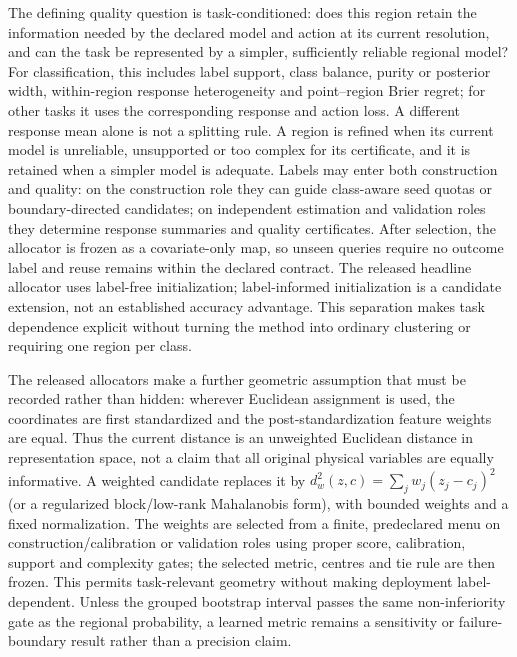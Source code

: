 \documentclass[10pt]{article}
\begin{document}
The defining quality question is task-conditioned: does this region retain the information needed by the declared model and action at its current resolution, and can the task be represented by a simpler, sufficiently reliable regional model? For classification, this includes label support, class balance, purity or posterior width, within-region response heterogeneity and point--region Brier regret; for other tasks it uses the corresponding response and action loss. A different response mean alone is not a splitting rule. A region is refined when its current model is unreliable, unsupported or too complex for its certificate, and it is retained when a simpler model is adequate. Labels may enter both construction and quality: on the construction role they can guide class-aware seed quotas or boundary-directed candidates; on independent estimation and validation roles they determine response summaries and quality certificates. After selection, the allocator is frozen as a covariate-only map, so unseen queries require no outcome label and reuse remains within the declared contract. The released headline allocator uses label-free initialization; label-informed initialization is a candidate extension, not an established accuracy advantage. This separation makes task dependence explicit without turning the method into ordinary clustering or requiring one region per class.

The released allocators make a further geometric assumption that must be recorded rather than hidden: wherever Euclidean assignment is used, the coordinates are first standardized and the post-standardization feature weights are equal. Thus the current distance is an unweighted Euclidean distance in representation space, not a claim that all original physical variables are equally informative. A weighted candidate replaces it by $d_w^2(z,c)=\sum_j w_j(z_j-c_j)^2$ (or a regularized block/low-rank Mahalanobis form), with bounded weights and a fixed normalization. The weights are selected from a finite, predeclared menu on construction/calibration or validation roles using proper score, calibration, support and complexity gates; the selected metric, centres and tie rule are then frozen. This permits task-relevant geometry without making deployment label-dependent. Unless the grouped bootstrap interval passes the same non-inferiority gate as the regional probability, a learned metric remains a sensitivity or failure-boundary result rather than a precision claim.
\end{document}
